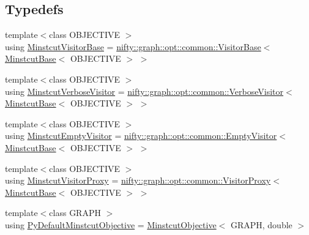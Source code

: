 \subsection*{Typedefs}
\begin{DoxyCompactItemize}
\item 
{\footnotesize template$<$class O\+B\+J\+E\+C\+T\+I\+VE $>$ }\\using \hyperlink{namespacenifty_1_1graph_1_1opt_1_1minstcut_a42d7fa14edf7c8f367a49541f392e5aa}{Minstcut\+Visitor\+Base} = \hyperlink{classnifty_1_1graph_1_1opt_1_1common_1_1VisitorBase}{nifty\+::graph\+::opt\+::common\+::\+Visitor\+Base}$<$ \hyperlink{classnifty_1_1graph_1_1opt_1_1minstcut_1_1MinstcutBase}{Minstcut\+Base}$<$ O\+B\+J\+E\+C\+T\+I\+VE $>$ $>$
\item 
{\footnotesize template$<$class O\+B\+J\+E\+C\+T\+I\+VE $>$ }\\using \hyperlink{namespacenifty_1_1graph_1_1opt_1_1minstcut_aa168742d4d2935e1348ea4b866f3ae09}{Minstcut\+Verbose\+Visitor} = \hyperlink{classnifty_1_1graph_1_1opt_1_1common_1_1VerboseVisitor}{nifty\+::graph\+::opt\+::common\+::\+Verbose\+Visitor}$<$ \hyperlink{classnifty_1_1graph_1_1opt_1_1minstcut_1_1MinstcutBase}{Minstcut\+Base}$<$ O\+B\+J\+E\+C\+T\+I\+VE $>$ $>$
\item 
{\footnotesize template$<$class O\+B\+J\+E\+C\+T\+I\+VE $>$ }\\using \hyperlink{namespacenifty_1_1graph_1_1opt_1_1minstcut_abf938a3f241189100b5df0217faaddfb}{Minstcut\+Empty\+Visitor} = \hyperlink{classnifty_1_1graph_1_1opt_1_1common_1_1EmptyVisitor}{nifty\+::graph\+::opt\+::common\+::\+Empty\+Visitor}$<$ \hyperlink{classnifty_1_1graph_1_1opt_1_1minstcut_1_1MinstcutBase}{Minstcut\+Base}$<$ O\+B\+J\+E\+C\+T\+I\+VE $>$ $>$
\item 
{\footnotesize template$<$class O\+B\+J\+E\+C\+T\+I\+VE $>$ }\\using \hyperlink{namespacenifty_1_1graph_1_1opt_1_1minstcut_a50858becd7b1ba218be1797c92e3a947}{Minstcut\+Visitor\+Proxy} = \hyperlink{classnifty_1_1graph_1_1opt_1_1common_1_1VisitorProxy}{nifty\+::graph\+::opt\+::common\+::\+Visitor\+Proxy}$<$ \hyperlink{classnifty_1_1graph_1_1opt_1_1minstcut_1_1MinstcutBase}{Minstcut\+Base}$<$ O\+B\+J\+E\+C\+T\+I\+VE $>$ $>$
\item 
{\footnotesize template$<$class G\+R\+A\+PH $>$ }\\using \hyperlink{namespacenifty_1_1graph_1_1opt_1_1minstcut_a066e5a061f3b821097a733b59298e7fc}{Py\+Default\+Minstcut\+Objective} = \hyperlink{classnifty_1_1graph_1_1opt_1_1minstcut_1_1MinstcutObjective}{Minstcut\+Objective}$<$ G\+R\+A\+PH, double $>$
\end{DoxyCompactItemize}
